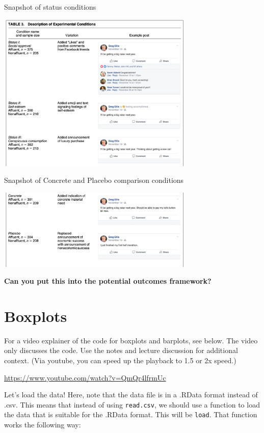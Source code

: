\documentclass[
  letterpaper,
  DIV=11,
  numbers=noendperiod]{scrreprt}
\begin{document}
Snapshot of status conditions

\includegraphics[width=0.7\textwidth,height=\textheight]{images/status1.png}

Snapshot of Concrete and Placebo comparison conditions

\includegraphics[width=0.7\textwidth,height=\textheight]{images/status2.png}

\textbf{Can you put this into the potential outcomes framework?}

\hypertarget{boxplots}{%
\section{Boxplots}\label{boxplots}}

For a video explainer of the code for boxplots and barplots, see below.
The video only discusses the code. Use the notes and lecture discussion
for additional context. (Via youtube, you can speed up the playback to
1.5 or 2x speed.)

\url{https://www.youtube.com/watch?v=QmQr4lfrmUc}

Let's load the data! Here, note that the data file is in a .RData format
instead of .csv. This means that instead of using \texttt{read.csv}, we
should use a function to load the data that is suitable for the .RData
format. This will be \texttt{load}. That function works the following
way:
\end{document}
